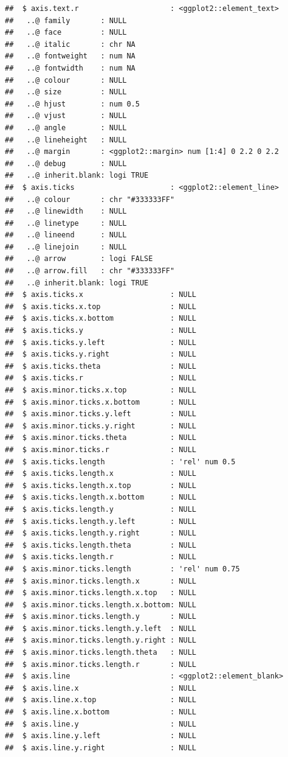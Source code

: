 \documentclass[
]{article}
\begin{document}
\begin{verbatim}
##  $ axis.text.r                     : <ggplot2::element_text>
##   ..@ family       : NULL
##   ..@ face         : NULL
##   ..@ italic       : chr NA
##   ..@ fontweight   : num NA
##   ..@ fontwidth    : num NA
##   ..@ colour       : NULL
##   ..@ size         : NULL
##   ..@ hjust        : num 0.5
##   ..@ vjust        : NULL
##   ..@ angle        : NULL
##   ..@ lineheight   : NULL
##   ..@ margin       : <ggplot2::margin> num [1:4] 0 2.2 0 2.2
##   ..@ debug        : NULL
##   ..@ inherit.blank: logi TRUE
##  $ axis.ticks                      : <ggplot2::element_line>
##   ..@ colour       : chr "#333333FF"
##   ..@ linewidth    : NULL
##   ..@ linetype     : NULL
##   ..@ lineend      : NULL
##   ..@ linejoin     : NULL
##   ..@ arrow        : logi FALSE
##   ..@ arrow.fill   : chr "#333333FF"
##   ..@ inherit.blank: logi TRUE
##  $ axis.ticks.x                    : NULL
##  $ axis.ticks.x.top                : NULL
##  $ axis.ticks.x.bottom             : NULL
##  $ axis.ticks.y                    : NULL
##  $ axis.ticks.y.left               : NULL
##  $ axis.ticks.y.right              : NULL
##  $ axis.ticks.theta                : NULL
##  $ axis.ticks.r                    : NULL
##  $ axis.minor.ticks.x.top          : NULL
##  $ axis.minor.ticks.x.bottom       : NULL
##  $ axis.minor.ticks.y.left         : NULL
##  $ axis.minor.ticks.y.right        : NULL
##  $ axis.minor.ticks.theta          : NULL
##  $ axis.minor.ticks.r              : NULL
##  $ axis.ticks.length               : 'rel' num 0.5
##  $ axis.ticks.length.x             : NULL
##  $ axis.ticks.length.x.top         : NULL
##  $ axis.ticks.length.x.bottom      : NULL
##  $ axis.ticks.length.y             : NULL
##  $ axis.ticks.length.y.left        : NULL
##  $ axis.ticks.length.y.right       : NULL
##  $ axis.ticks.length.theta         : NULL
##  $ axis.ticks.length.r             : NULL
##  $ axis.minor.ticks.length         : 'rel' num 0.75
##  $ axis.minor.ticks.length.x       : NULL
##  $ axis.minor.ticks.length.x.top   : NULL
##  $ axis.minor.ticks.length.x.bottom: NULL
##  $ axis.minor.ticks.length.y       : NULL
##  $ axis.minor.ticks.length.y.left  : NULL
##  $ axis.minor.ticks.length.y.right : NULL
##  $ axis.minor.ticks.length.theta   : NULL
##  $ axis.minor.ticks.length.r       : NULL
##  $ axis.line                       : <ggplot2::element_blank>
##  $ axis.line.x                     : NULL
##  $ axis.line.x.top                 : NULL
##  $ axis.line.x.bottom              : NULL
##  $ axis.line.y                     : NULL
##  $ axis.line.y.left                : NULL
##  $ axis.line.y.right               : NULL

\end{verbatim}
\end{document}
